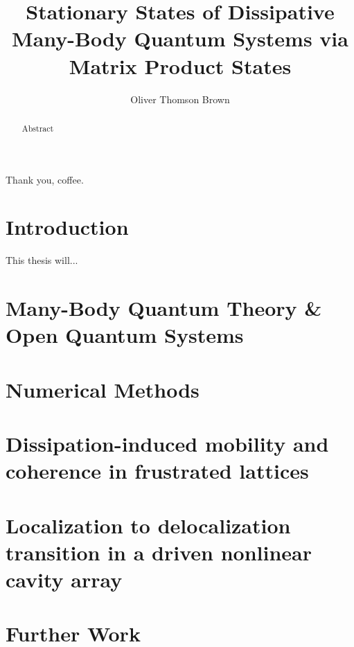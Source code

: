 \documentclass[a4paper,oneside,12pt]{hwthesis}
\author{Oliver Thomson Brown}
\title{Stationary States of Dissipative Many-Body Quantum Systems via Matrix Product States}
\newcommand*{\chappath}{../../include/chapters}
\newcommand*{\refpath}{../../include/refs}
\begin{document}
\maketitle


\begin{acknowledgements}
Thank you, coffee.
\end{acknowledgements}

\begin{abstract}
Abstract
\end{abstract}

\tableofcontents

\chapter{Introduction}
\setcounter{page}{1}

This thesis will...

\chapter[MBQT \& OQS]{Many-Body Quantum Theory \& Open Quantum Systems}


\chapter{Numerical Methods}



\chapter[Frustrated lattices]{Dissipation-induced mobility and coherence in frustrated lattices}



\chapter[Driven nonlinear cavity array]{Localization to delocalization transition in a driven nonlinear cavity array}

\chapter{Further Work}



\end{document}
